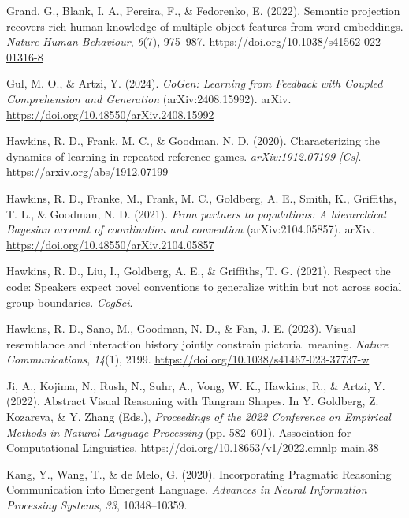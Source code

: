 \documentclass[10pt, letterpaper]{article}
\begin{document}
\begin{CSLReferences}{1}{0}
Grand, G., Blank, I. A., Pereira, F., \& Fedorenko, E. (2022). Semantic
projection recovers rich human knowledge of multiple object features
from word embeddings. \emph{Nature Human Behaviour}, \emph{6}(7),
975--987. \url{https://doi.org/10.1038/s41562-022-01316-8}

Gul, M. O., \& Artzi, Y. (2024). \emph{{CoGen}: {Learning} from
{Feedback} with {Coupled Comprehension} and {Generation}}
(arXiv:2408.15992). arXiv.
\url{https://doi.org/10.48550/arXiv.2408.15992}

Hawkins, R. D., Frank, M. C., \& Goodman, N. D. (2020). Characterizing
the dynamics of learning in repeated reference games.
\emph{arXiv:1912.07199 {[}Cs{]}}. \url{https://arxiv.org/abs/1912.07199}

Hawkins, R. D., Franke, M., Frank, M. C., Goldberg, A. E., Smith, K.,
Griffiths, T. L., \& Goodman, N. D. (2021). \emph{From partners to
populations: {A} hierarchical {Bayesian} account of coordination and
convention} (arXiv:2104.05857). arXiv.
\url{https://doi.org/10.48550/arXiv.2104.05857}

Hawkins, R. D., Liu, I., Goldberg, A. E., \& Griffiths, T. G. (2021).
Respect the code: {Speakers} expect novel conventions to generalize
within but not across social group boundaries. \emph{CogSci}.

Hawkins, R. D., Sano, M., Goodman, N. D., \& Fan, J. E. (2023). Visual
resemblance and interaction history jointly constrain pictorial meaning.
\emph{Nature Communications}, \emph{14}(1), 2199.
\url{https://doi.org/10.1038/s41467-023-37737-w}

Ji, A., Kojima, N., Rush, N., Suhr, A., Vong, W. K., Hawkins, R., \&
Artzi, Y. (2022). Abstract {Visual Reasoning} with {Tangram Shapes}. In
Y. Goldberg, Z. Kozareva, \& Y. Zhang (Eds.), \emph{Proceedings of the
2022 {Conference} on {Empirical Methods} in {Natural Language
Processing}} (pp. 582--601). Association for Computational Linguistics.
\url{https://doi.org/10.18653/v1/2022.emnlp-main.38}

Kang, Y., Wang, T., \& de Melo, G. (2020). Incorporating {Pragmatic
Reasoning Communication} into {Emergent Language}. \emph{Advances in
{Neural Information Processing Systems}}, \emph{33}, 10348--10359.


\end{CSLReferences}
\end{document}
